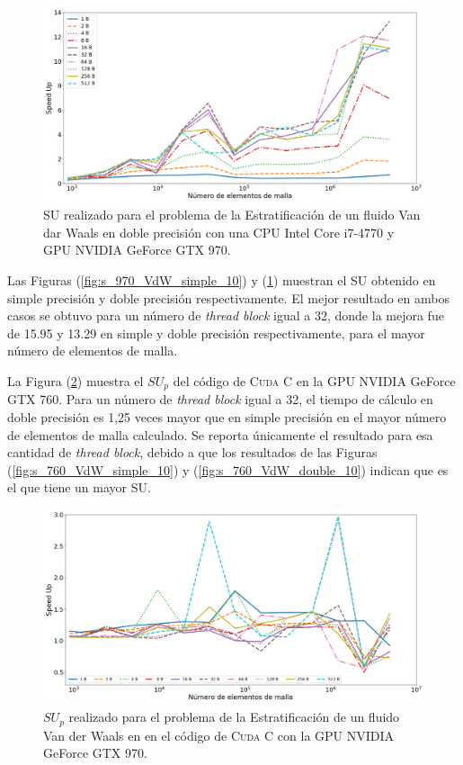 \begin{figure}[h!]
	\centering
	\includegraphics[width=\textwidth]{figs/cap4/s_970_VdW_double_10}
	\caption{SU realizado para el problema de la Estratificación de un fluido Van dar Waals en doble precisión con una CPU Intel Core i7-4770 y GPU NVIDIA GeForce GTX 970.} 
	\label{fig:s_970_VdW_double_10}	
\end{figure}

\newpage

Las Figuras (\ref{fig:s_970_VdW_simple_10}) y (\ref{fig:s_970_VdW_double_10}) muestran el SU obtenido en simple precisión y doble precisión respectivamente. El mejor resultado en ambos casos se obtuvo para un número de \textit{thread block} igual a 32, donde la mejora fue de 15.95 y 13.29 en simple y doble precisión respectivamente, para el mayor número de elementos de malla.

La Figura (\ref{fig:c_970_VdW_cuda_10}) muestra el ${SU}_p$ del código de \textsc{Cuda C} en la GPU NVIDIA GeForce GTX 760. Para un número de \textit{thread block} igual a 32, el tiempo de cálculo en doble precisión es 1,25 veces mayor que en simple precisión en el mayor número de elementos de malla calculado. Se reporta únicamente el resultado para esa cantidad de \textit{thread block}, debido a que los resultados de las Figuras (\ref{fig:s_760_VdW_simple_10}) y (\ref{fig:s_760_VdW_double_10}) indican que es el que tiene un mayor SU.


\begin{figure}[h!]
	\centering
	\includegraphics[width=\textwidth]{figs/cap4/c_970_VdW_cuda_10}
	\caption{$SU_p$ realizado para el problema de la Estratificación de un fluido Van der Waals en en el código de \textsc{Cuda C} con la GPU NVIDIA GeForce GTX 970.} 
	\label{fig:c_970_VdW_cuda_10}	
\end{figure}

